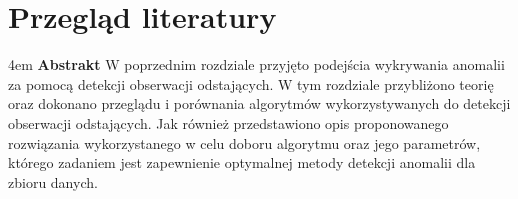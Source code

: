 \chapter{Przegląd literatury}


\begingroup
\leftskip4em
\rightskip\leftskip
\noindent
\textbf{Abstrakt} W poprzednim rozdziale przyjęto podejścia wykrywania anomalii za pomocą detekcji obserwacji odstających. W tym rozdziale przybliżono teorię oraz dokonano przeglądu i porównania algorytmów wykorzystywanych do detekcji obserwacji odstających. Jak również przedstawiono opis proponowanego rozwiązania wykorzystanego w celu doboru algorytmu oraz jego parametrów, którego zadaniem jest zapewnienie optymalnej metody detekcji anomalii dla zbioru danych.
\par
\endgroup



